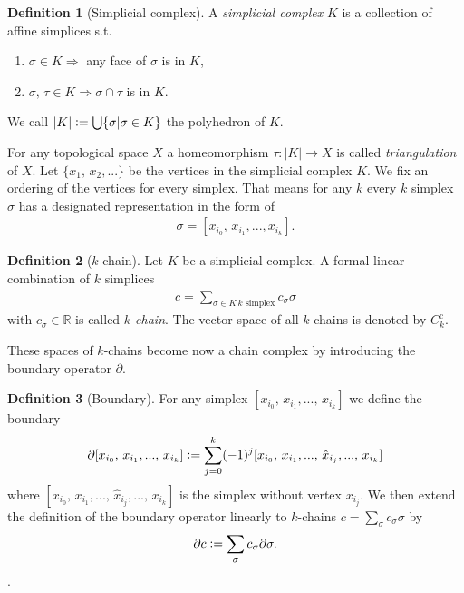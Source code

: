 \documentclass[12pt,a4paper]{article}
\theoremstyle{definition}
\newtheorem{definition}{Definition}
\newcommand{\real}{\mathbb{R}}
\begin{document}
\begin{definition}[Simplicial complex]
    A \textit{simplicial complex} $K$ is a collection of affine simplices s.t.
    \begin{enumerate}
        \item $\sigma \in K \Rightarrow$ any face of $\sigma$ is in $K$,
        \item $\sigma,\, \tau \in K \Rightarrow \sigma \cap \tau$ is in $K$.
    \end{enumerate}
    We call $|K| \vcentcolon= \bigcup \{ \sigma | \sigma \in K\}$ the polyhedron of 
    $K$.
\end{definition}
For any topological space $X$ a homeomorphism 
$\tau: |K| \rightarrow X$ is called \textit{triangulation} of $X$.
Let $\{x_1,\, x_2,...\}$ be the vertices in the simplicial complex $K$.
We fix an ordering of the vertices for every simplex. 
That means for any $k$ every $k$ simplex $\sigma$ has
a designated representation in the form of
\begin{align*}
    \sigma = [x_{i_0},\, x_{i_1}, ...,x_{i_k}].
\end{align*} 

\begin{definition}[$k$-chain]
    Let $K$ be a simplicial complex. A formal linear combination of $k$ 
    simplices
    \begin{align*}
        c = \sum\limits_{\sigma \in K\, k \text{ simplex}} c_\sigma \sigma
    \end{align*}
    with $c_\sigma \in \real$ is called \textit{$k$-chain}. The vector space 
    of all $k$-chains is denoted by ${C}^\text{c}_k$.
\end{definition}

These spaces of $k$-chains become now a chain complex by introducing the 
boundary operator $\partial$.

\begin{definition}[Boundary]
    For any simplex $[x_{i_0},\, x_{i_1},...,\, x_{i_k}]$ we define the boundary
    \begin{align*}
        \partial[x_{i_0},\, x_{i_1},...,\, x_{i_k}] \vcentcolon=
        \sum\limits_{j=0}^k (-1)^j [x_{i_0},\, x_{i_1},...,\, 
        \hat{x}_{i_j},...,\, x_{i_k}]
    \end{align*}
    where $[x_{i_0},\, x_{i_1},...,\, \hat{x}_{i_j},...,\, x_{i_k}]$ is the
    simplex without vertex $x_{i_j}$. We then extend the definition
    of the boundary operator linearly to $k$-chains 
    $c = \sum_\sigma c_\sigma \sigma$ by
    \begin{align*}
        \partial c \vcentcolon= \sum\limits_\sigma c_\sigma \partial \sigma.
    \end{align*}.
\end{definition}
\end{document}
